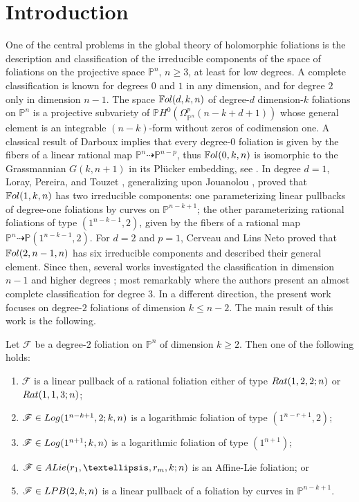 \documentclass[twoside]{amsart}
\numberwithin{equation}{section}
\newcommand{\p}[1]{{\mathbb{P}^{#1}}}
\newcommand{\pn}{{\mathbb{P}^{n}}}
\def\PP{{\mathbb{P}}}
\newcommand{\sF}{\mathscr{F}}
\newcommand{\Fol}{\mathbb{F}{\rm ol}}
\newcommand{\lpb}[3]{{\rm LPB }(#1,#2,#3)}
\newcommand{\rat}[2]{{\rm Rat}(#1;#2)}
\newcommand{\logg}[3]{{\rm Log}(#1;#2,#3)}
\newcommand{\exc}[3]{{\rm ALie}(#1,#2;#3)}
\newenvironment{thmintro}[1]
{\renewcommand\theinnerthmintro{#1}\innerthmintro}
{\endinnerthmintro}
\theoremstyle{definition}
\begin{document}
\tableofcontents


\section{Introduction}
One of the central problems in the global theory of holomorphic foliations is the description and classification of the irreducible components of the space of foliations on the projective space $\pn$, $n \geq 3$, at least for low degrees. A complete classification is known for degrees $0$ and $1$ in any dimension, and for degree $2$ only in dimension $n-1$. The space $\Fol(d,k,n)$ of degree-$d$ dimension-$k$ foliations on $\pn$ is a projective subvariety of $\PP H^0(\Omega_\pn^p(n-k+d+1))$ whose general element is an integrable $(n-k)$-form without zeros of codimension one. A classical result of Darboux implies that every degree-$0$ foliation is given by the fibers of a linear rational map $\pn \dashrightarrow \p{n-p}$, thus $\Fol(0,k,n)$ is isomorphic to the Grassmannian $G(k,n+1)$ in its Pl\"ucker embedding, see \cite[ Th\'eor\`eme 3.8]{CD2}. In degree $d=1$, Loray, Pereira, and Touzet \cite{LPT2}, generalizing upon Jouanolou \cite{Jou}, proved that $\Fol(1,k,n)$ has two irreducible components: one parameterizing linear pullbacks of degree-one foliations by curves on $\p{n-k+1}$; the other parameterizing rational foliations of type $(1^{n-k-1},2)$, given by the fibers of a rational map $\pn \dashrightarrow \PP(1^{n-k-1},2)$. For $d=2$ and $p=1$, Cerveau and Lins Neto \cite{CLN} proved that $\Fol(2,n-1,n)$ has six irreducible components and described their general element. Since then, several works investigated the classification in dimension $n-1$ and higher degrees \cite{CLNdeg3,  AVdeg4, LPT3}; most remarkably \cite{CLPdeg3} where the authors present an almost complete classification for degree $3$. In a different direction, the present work focuses on degree-$2$ foliations of dimension $k \leq n-2$. The main result of this work is the following.

\begin{thmintro}{A}\label{thm:mainA}
Let $\sF$ be a degree-$2$ foliation on $\pn$ of dimension $k\geq2$. Then one of the following holds:
\begin{enumerate}
    \item $\sF$ is  a linear pullback of a rational foliation either of type $\rat{1,2,2}{n}$ or  $\rat{1,1,3}{n}$;
    \item $\sF \in \logg{1^{n-k+1},2}{k}{n}$ is a logarithmic foliation of type $(1^{n-r +1}, 2)$;
    \item $\sF \in \logg{1^{n+1}}{k}{n}$ is a logarithmic foliation of type $(1^{n+1})$;
    \item  $\sF \in \exc{r_1, \dots,r_m}{k}{n}$ is an  Affine-Lie foliation; or
    \item $\sF \in \lpb{2}{k}{n}$ is a linear pullback of a foliation by curves in $\p{n-k+1}$.
\end{enumerate}
\end{thmintro}
\end{document}

